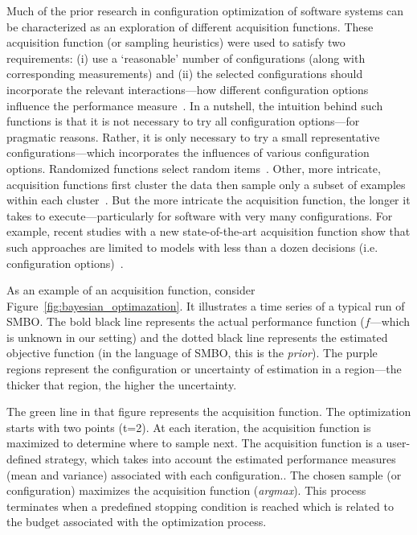 \documentclass[10pt,journal,compsoc]{IEEEtran}
\begin{document}
Much of the prior  research in configuration optimization of software systems can
be characterized as an exploration of 
different acquisition functions.
These acquisition function (or sampling heuristics) were used to satisfy two requirements: (i) use a `reasonable' number of configurations (along with corresponding measurements) and (ii) the selected configurations should incorporate the relevant interactions---how different configuration options influence the performance measure~\cite{Siegmund2015}.
In a nutshell, the intuition behind such functions is that it is not necessary to try all configuration options---for pragmatic reasons. Rather, it is only necessary to try a small representative configurations---which incorporates the influences of various configuration options.
Randomized  functions
 select random items~\cite{guo2013variability, sarkar2015cost}. Other, more intricate,
acquisition functions first cluster the data then sample only
a subset of examples within each cluster~\cite{nair17}.
But the more intricate the acquisition function, the longer it
takes to execute---particularly for software with very many configurations.  For example,
recent studies with   a new state-of-the-art acquisition function show that such approaches are limited to models with less than a dozen decisions (i.e. configuration options)~\cite{zuluaga2016varepsilon}.




As an example of an acquisition function, consider
Figure~\ref{fig:bayesian_optimazation}. It illustrates a time series of a typical
 run of SMBO. The bold black line represents the actual performance function ($f$---which is unknown in our setting) and the dotted black line represents the estimated objective function (in the language of SMBO, this is the {\em prior}). 
 The purple regions represent the configuration or uncertainty of estimation in a region---the thicker that region, the higher the uncertainty.
 
 The green line in that figure represents the acquisition function. The optimization starts with two points (t=2). At each iteration, the acquisition function is maximized to determine where to sample next. The acquisition function is a user-defined strategy, which takes into account the estimated performance measures (mean and variance) associated with each configuration.. The chosen sample (or configuration) maximizes the acquisition function (\textit{argmax}). This process terminates when a predefined stopping condition is reached which is related to the budget associated with the optimization process.
\end{document}
